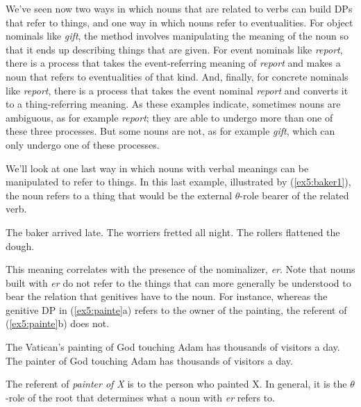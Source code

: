 We've seen now two ways in which nouns that are related to verbs can build DPs that refer to things, and one way in which nouns refer to eventualities. For object nominals like \emph{gift}, the method involves manipulating the meaning of the noun so that it ends up describing things that are given. For event nominals like \emph{report}, there is a process that takes the event-referring meaning of \emph{report} and makes a noun that refers to eventualities of that kind. And, finally, for concrete nominals like \emph{report}, there is a process that takes the event nominal \emph{report} and converts it to a thing-referring meaning. As these examples indicate, sometimes nouns are ambiguous, as for example \emph{report}; they are able to undergo more than one of these three processes. But some nouns are not, as for example \emph{gift}, which can only undergo one of these processes.

We'll look at one last way in which nouns with verbal meanings can be manipulated to refer to things. In this last example, illustrated by (\ref{ex5:baker1}), the noun refers to a thing that would be the external $\theta$-role bearer of the related verb.
\begin{exe}
	\raggedright
	\ex \label{ex5:baker1} 
	\begin{xlist}
		\ex The baker arrived late.
		\ex The worriers fretted all night.
		\ex The rollers flattened the dough.
	\end{xlist}
\end{exe}
This meaning correlates with the presence of the nominalizer, \emph{er}. Note that nouns built with \emph{er} do not refer to the things that can more generally be understood to bear the relation that genitives have to the noun. For instance, whereas the genitive DP in (\ref{ex5:painte}a) refers to the owner of the painting, the referent of (\ref{ex5:painte}b) does not.
\begin{exe}
	\raggedright
	\ex \label{ex5:painte} 
	\begin{xlist}
		\ex The Vatican's painting of God touching Adam has thousands of visitors a day.
		\ex The painter of God touching Adam has thousands of visitors a day.
	\end{xlist}
\end{exe}
The referent of \emph{painter of X} is to the person who painted X. In general, it is the $\theta$-role of the root that determines what a noun with \emph{er} refers to.

